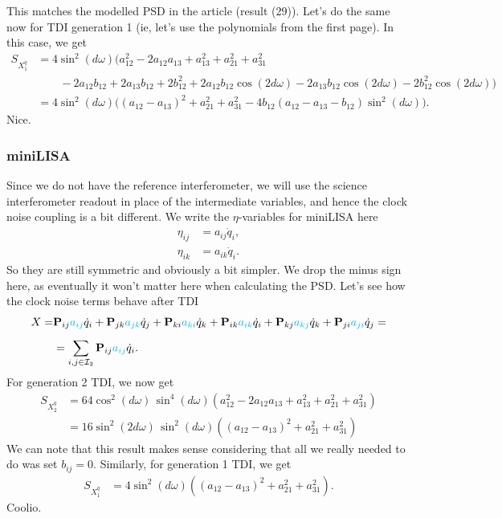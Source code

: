 \documentclass[11pt]{article}
\begin{document}
This matches the modelled PSD in the article (result (29)). Let's do the same now for TDI generation 1 (ie, let's use the polynomials from the first page). In this case, we get
\begin{align*}
    S_{X_1^{\dot q}}
&=4 \sin^2(d \omega) \big(
    a_{12}^2 
    - 2 a_{12} a_{13}
    + a_{13}^2
    + a_{21}^2
    + a_{31}^2\\
&\qquad
  - 2 a_{12} b_{12}
    + 2 a_{13} b_{12}
    + 2 b_{12}^2
    + 2 a_{12} b_{12} \cos(2 d \omega)
    - 2 a_{13} b_{12} \cos(2 d \omega)
    - 2 b_{12}^2 \cos(2 d \omega)
\big)\\[6pt]
&=4 \sin^2(d \omega) \big(
    (a_{12}-a_{13})^2
    + a_{21}^2
    + a_{31}^2
  - 4 b_{12}\left(a_{12}-a_{13}-b_{12}\right)\sin^{2}(d\omega)\big).
\end{align*}
Nice.
\subsubsection{miniLISA}
Since we do not have the reference interferometer, we will use the science interferometer readout in place of the intermediate variables, and hence the clock noise coupling is a bit different. We write the $\eta$-variables for miniLISA here
\begin{align*}
    \eta_{ij}&=a_{ij}\dot{q}_i,\\
    \eta_{ik}&=a_{ik}\dot{q}_i.
\end{align*}
So they are still symmetric and obviously a bit simpler. We drop the minus sign here, as eventually it won't matter here when calculating the PSD. Let's see how the clock noise terms behave after TDI
\begin{align*}
    X=&\mathbf{P}_{ij}\color{cyan}a_{ij}\color{black}\dot{q}_i
    +\mathbf{P}_{jk}\color{cyan}a_{jk}\color{black}\dot{q}_j
    +\mathbf{P}_{ki}\color{cyan}a_{ki}\color{black}\dot{q}_k+
    \mathbf{P}_{ik}\color{cyan}a_{ik}\color{black}\dot{q}_i+
    \mathbf{P}_{kj}\color{cyan}a_{kj}\color{black}\dot{q}_k+
    \mathbf{P}_{ji}\color{cyan}a_{ji}\color{black}\dot{q}_j=\\[5pt]
    &=\sum_{i,j\in\mathcal{I}_2}\mathbf{P}_{ij}\color{cyan}a_{ij}\color{black}\dot{q}_i.
\end{align*}
For generation 2 TDI, we now get
\begin{align*}
    S_{X_2^{\dot q}}
&=64 
\cos^2(d \omega)\,
\sin^4(d \omega)\left(
    a_{12}^2
    - 2 a_{12} a_{13}
    + a_{13}^2
    + a_{21}^2
    + a_{31}^2
\right)\\
&=16 \sin^{2}(2d\omega)\,\sin^{2}(d\omega)\left(
    (a_{12}
    -  a_{13})^2
    + a_{21}^2
    + a_{31}^2
\right)
\end{align*}
We can note that this result makes sense considering that all we really needed to do was set $b_{ij}=0$. Similarly, for generation 1 TDI, we get
\begin{align*}
    S_{X_1^{\dot q}}
&=4\sin^2(d \omega) \left(
    (a_{12}- a_{13})^2 + a_{21}^2 + a_{31}^2\right).
\end{align*}
Coolio.
\end{document}
